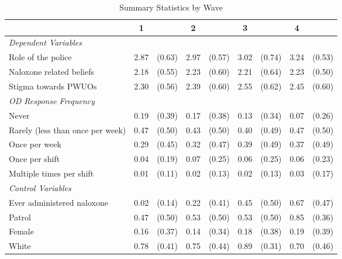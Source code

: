 \begin{table}[htbp]\centering
\def\sym#1{\ifmmode^{#1}\else\(^{#1}\)\fi}
\caption{\centering Summary Statistics by Wave}
\begin{adjustbox}{max width=\linewidth}\begin{tabular}{l*{4}{cc}}
\toprule
                &        1&         &        2&         &        3&         &        4&         \\
\midrule
\emph{Dependent Variables}&         &         &         &         &         &         &         &         \\
Role of the police&     2.87&   (0.63)&     2.97&   (0.57)&     3.02&   (0.74)&     3.24&   (0.53)\\
Naloxone related beliefs&     2.18&   (0.55)&     2.23&   (0.60)&     2.21&   (0.64)&     2.23&   (0.50)\\
Stigma towards PWUOs&     2.30&   (0.56)&     2.39&   (0.60)&     2.55&   (0.62)&     2.45&   (0.60)\\
\emph{OD Response Frequency}&         &         &         &         &         &         &         &         \\
Never           &     0.19&   (0.39)&     0.17&   (0.38)&     0.13&   (0.34)&     0.07&   (0.26)\\
Rarely (less than once per week)&     0.47&   (0.50)&     0.43&   (0.50)&     0.40&   (0.49)&     0.47&   (0.50)\\
Once per week   &     0.29&   (0.45)&     0.32&   (0.47)&     0.39&   (0.49)&     0.37&   (0.49)\\
Once per shift  &     0.04&   (0.19)&     0.07&   (0.25)&     0.06&   (0.25)&     0.06&   (0.23)\\
Multiple times per shift&     0.01&   (0.11)&     0.02&   (0.13)&     0.02&   (0.13)&     0.03&   (0.17)\\
\vspace{0.1em} \emph{Control Variables}&         &         &         &         &         &         &         &         \\
Ever administered naloxone&     0.02&   (0.14)&     0.22&   (0.41)&     0.45&   (0.50)&     0.67&   (0.47)\\
Patrol          &     0.47&   (0.50)&     0.53&   (0.50)&     0.53&   (0.50)&     0.85&   (0.36)\\
Female          &     0.16&   (0.37)&     0.14&   (0.34)&     0.18&   (0.38)&     0.19&   (0.39)\\
White           &     0.78&   (0.41)&     0.75&   (0.44)&     0.89&   (0.31)&     0.70&   (0.46)\\

\end{tabular}
\end{adjustbox}
\end{table}
